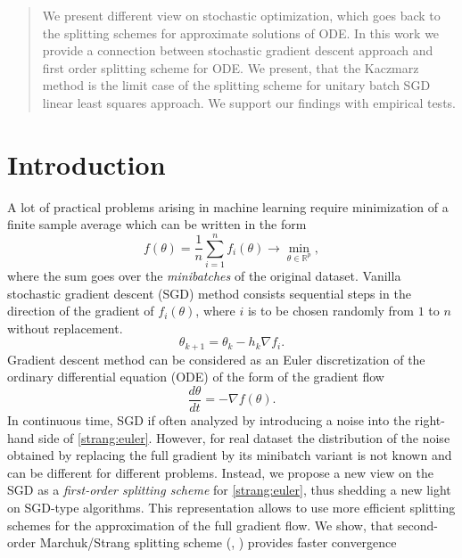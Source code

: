 \documentclass{article}
\begin{document}
\begin{abstract}
We present different view on stochastic optimization, which goes back to the splitting schemes for approximate solutions of ODE. In this work we provide a connection between stochastic gradient descent approach and first order splitting scheme for ODE. We present, that the Kaczmarz method is the limit case of the splitting scheme for unitary batch SGD linear least squares approach. We support our findings with empirical tests.
\end{abstract}

\section{Introduction}
A lot of practical problems arising in machine learning require minimization of a finite sample average which can be written in the form
\begin{equation}\label{strang:finitesum}
    f(\theta) = \frac{1}{n} \sum_{i=1}^n f_i(\theta) \rightarrow \min_{\theta \in \mathbb{R}^p},
\end{equation}
where the sum goes over the \emph{minibatches} of the original dataset. Vanilla stochastic gradient descent (SGD) method \cite{robbins1951stochastic} consists sequential steps in the direction of the gradient of $f_i(\theta)$, where $i$ is to be chosen randomly from $1$ to $n$ without replacement.
\begin{equation}
\theta_{k+1} = \theta_{k} - h_{k} \nabla f_i.
\end{equation}
Gradient descent method can be considered as an Euler discretization of the ordinary differential equation (ODE) of the form of the gradient flow
\begin{equation}\label{strang:euler}
    \frac{d \theta}{d t} = -\nabla f(\theta).
\end{equation}
In continuous time, SGD if often analyzed by introducing a noise into the right-hand side of \eqref{strang:euler}. However, for real dataset the distribution of the noise obtained by replacing the full gradient by its minibatch variant is not known and can be different for different problems. Instead, we propose a new view on the SGD as a \emph{first-order splitting scheme} for \eqref{strang:euler}, thus shedding a new light on SGD-type algorithms. This representation allows to use more efficient splitting schemes for the approximation of the full gradient flow. We show, that second-order Marchuk/Strang splitting scheme (\cite{marchuk1968some}, \cite{strang1968construction}) provides faster convergence 
\end{document}
